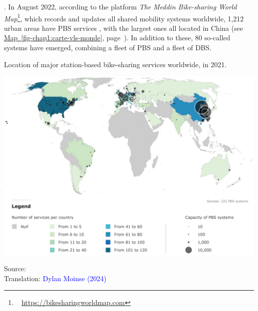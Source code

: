 \begin{refsegment}
{} \textcolor{blue}{\autocite[225]{dauncey_french_2012}}. In August 2022, according to the platform \textsl{The Meddin Bike-sharing World Map}\footnote{~
    \url{https://bikesharingworldmap.com}
}, which records and updates all shared mobility systems worldwide, 1,212 urban areas have \acrshort{PBS} services \textcolor{blue}{\autocite[7]{the_meddin_bike-sharing_world_map_meddin_2022}}, with the largest ones all located in China (see \hyperref[fig-chap1:carte-vls-monde]{Map~\ref{fig-chap1:carte-vls-monde}}, page~\pageref{fig-chap1:carte-vls-monde}). In addition to these, 80 so-called  systems have emerged, combining a fleet of \acrshort{PBS} and a fleet of \acrfull{DBS}.%

\begin{carte}[h!]\vspace*{4pt}
    \caption{Location of major station-based bike-sharing services worldwide, in 2021.}
    \label{fig-chap1:carte-vls-monde}
    \centerline{\includegraphics[width=1\columnwidth]{src/Figures/Chap-1/EN_Carte_VLS_monde.png}}
    \vspace{5pt}
    \begin{flushright}\scriptsize{
    Source: \textcolor{blue}{\textcite{todd_global_2021}}
    \\
    Translation: \textcolor{blue}{Dylan Moinse (2024)}
    }\end{flushright}
\end{carte}


\end{refsegment}

